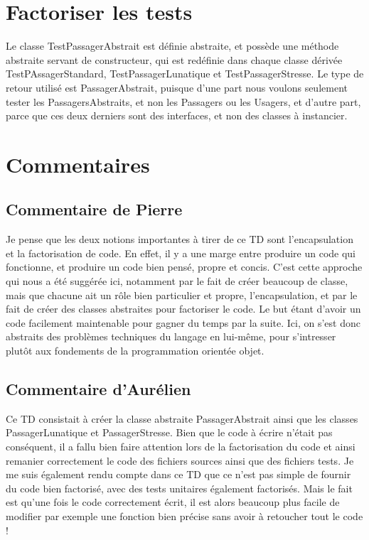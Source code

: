 \documentclass[a4paper,11pt]{article}
\begin{document}
\section{Factoriser les tests}
Le classe TestPassagerAbstrait est définie abstraite, et possède une méthode abstraite servant de constructeur, qui est redéfinie dans chaque classe dérivée TestPAssagerStandard, TestPassagerLunatique et TestPassagerStresse. Le type de retour utilisé est PassagerAbstrait, puisque d'une part nous voulons seulement tester les PassagersAbstraits, et non les Passagers ou les Usagers, et d'autre part, parce que ces deux derniers sont des interfaces, et non des classes à instancier.

\section{Commentaires}
\subsection{Commentaire de Pierre}
Je pense que les deux notions importantes à tirer de ce TD sont l'encapsulation et la factorisation de code. En effet, il y a une marge entre produire un code qui fonctionne, et produire un code bien pensé, propre et concis. C'est cette approche qui nous a été suggérée ici, notamment par le fait de créer beaucoup de classe, mais que chacune ait un rôle bien particulier et propre, l'encapsulation, et par le fait de créer des classes abstraites pour factoriser le code. Le but étant d'avoir un code facilement maintenable pour gagner du temps par la suite. Ici, on s'est donc abstraits des problèmes techniques du langage en lui-même, pour s'intresser plutôt aux fondements de la programmation orientée objet.

\subsection{Commentaire d'Aurélien}
Ce TD consistait à créer la classe abstraite PassagerAbstrait ainsi que les classes PassagerLunatique et PassagerStresse. Bien que le code à écrire n'était pas conséquent, il a fallu bien faire attention lors de la factorisation du code et ainsi remanier correctement le code des fichiers sources ainsi que des fichiers tests. Je me suis également rendu compte dans ce TD que ce n'est pas simple de fournir du code bien factorisé, avec des tests unitaires également factorisés. Mais le fait est qu'une fois le code correctement écrit, il est alors beaucoup plus facile de modifier par exemple une fonction bien précise sans avoir à retoucher tout le code !
\end{document}
